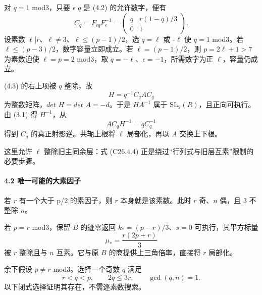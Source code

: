 {对} {\ensuremath{q=1}} {mod3，只要} {\ensuremath{\epsilon }} {\ensuremath{q}} {是} {(4.2)} {的允许数字，便有} \[
C_q=F_{\epsilon q}F_\epsilon^{-1}
=\begin{pmatrix}q&r(1-q)/3\\0&1\end{pmatrix}.
\tag{C26.4.3}
\] {设素数} {\ensuremath{\ell |r}、\ensuremath{\ell \ne 3}、\ensuremath{\ell \le (p-1)/2}，选} {\ensuremath{q=\ell }} {或} {-\ensuremath{\ell }} {使} {\ensuremath{q=1}} {mod3。若} {\ensuremath{\ell \le (p-3)/2}，数字容量立即成立。若} {\ensuremath{\ell =(p-1)/2}，则} {\ensuremath{p=2\ell +1>7}} {为素数迫使} {\ensuremath{\ell =p=2}} {mod3，取} {\ensuremath{q=-\ell }、\ensuremath{\epsilon =-1}，所需数字为正} {\ensuremath{\ell }，容量仍成立。}

{(4.3)} {的右上项被} {\ensuremath{q}} {整除，故} \[
H=q^{-1}C_qAC_q
\] {为整数矩阵，\ensuremath{det}} {\ensuremath{H=det}} {\ensuremath{A=-d}。于是} {\ensuremath{HA^{-1}}} {属于} {\ensuremath{\mathrm{SL}_{2}(R)}，且正向可执行。由} {(3.1)} {得} {\ensuremath{H^{-1}}，从} \[
AC_qH^{-1}=qC_q^{-1}
\tag{C26.4.4}
\] {得到} {\ensuremath{C_{q}}} {的真正射影逆。共轭上根将} {\ensuremath{\ell }} {局部化，再以} {\ensuremath{A}} {交换上下根。}

{这里允许} {\ensuremath{\ell }} {整除旧主同余层：式} {(C26.4.4)} {正是绕过``行列式与旧层互素''限制的必要步骤。}

\paragraph*{\texorpdfstring{{4.2} {唯一可能的大素因子}}{4.2 唯一可能的大素因子}}\label{C26-h162}

{若} {\ensuremath{r}} {有一个大于} {p/2} {的素因子，则} {\ensuremath{r}} {本身就是该素数。此时} {\ensuremath{r}} {奇、\ensuremath{n}} {偶，且} {3} {不整除} {\ensuremath{n}。}

{若} {\ensuremath{p=r}} {mod3，保留} {\ensuremath{B}} {的迹零返回} {\ensuremath{k_*=(p-r)/3}、\ensuremath{s=0}} {可执行，其平方标量} \[
\mu_*=\frac{r(2p+r)}3
\] {被} {\ensuremath{r}} {整除且与} {\ensuremath{n}} {互素。它与原} {\ensuremath{B}} {的商提供上三角倍率，直接将} {\ensuremath{r}} {局部化。}

{余下假设} {\ensuremath{p\ne r}} {mod3。选择一个奇数} {\ensuremath{q}} {满足} \[
r<q<p,\qquad2q\le3r,\qquad\gcd(q,n)=1.
\tag{C26.4.5}
\] {以下闭式选择证明其存在，不需逐素数搜索。}

